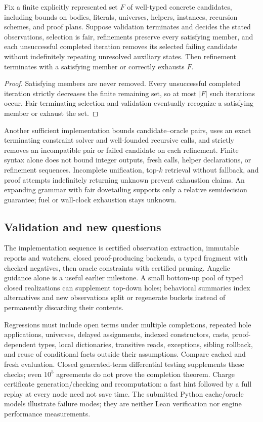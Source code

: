 \begin{theorem}\label{thm:evaluation-bounded}
Fix a finite explicitly represented set $F$ of well-typed concrete candidates,
including bounds on bodies, literals, universes, helpers, instances, recursion
schemes, and proof plans. Suppose validation terminates and decides the stated
observations, selection is fair, refinements preserve every satisfying member,
and each unsuccessful completed iteration removes its selected failing
candidate without indefinitely repeating unresolved auxiliary states.
Then refinement terminates with a satisfying member or correctly exhausts $F$.
\end{theorem}
\begin{proof}
Satisfying members are never removed. Every unsuccessful completed iteration
strictly decreases the finite remaining set, so at most $|F|$ such iterations
occur. Fair terminating selection and validation eventually recognize a
satisfying member or exhaust the set.
\end{proof}

Another sufficient implementation bounds candidate--oracle pairs, uses an
exact terminating constraint solver and well-founded recursive calls, and
strictly removes an incompatible pair or failed candidate on each refinement.
Finite syntax alone does not bound integer outputs, fresh calls, helper
declarations, or refinement sequences. Incomplete unification, top-$k$ retrieval
without fallback, and proof attempts indefinitely returning unknown prevent
exhaustion claims. An expanding grammar with fair dovetailing supports only a
relative semidecision guarantee; fuel or wall-clock exhaustion stays unknown.

\subsection{Validation and new questions}\label{sec:evaluation-checks}

The implementation sequence is certified observation extraction, immutable
reports and watchers, closed proof-producing backends, a typed fragment with
checked negatives, then oracle constraints with certified pruning. Angelic
guidance alone is a useful earlier milestone. A small bottom-up pool of typed
closed realizations can supplement top-down holes; behavioral summaries index
alternatives and new observations split or regenerate buckets instead of
permanently discarding their contents.

Regressions must include open terms under multiple completions, repeated hole
applications, universes, delayed assignments, indexed constructors, casts,
proof-dependent types, local dictionaries, transitive reads, exceptions,
sibling rollback, and reuse of conditional facts outside their assumptions.
Compare cached and fresh evaluation. Closed generated-term differential
testing supplements these checks; even $10^5$ agreements do not prove the
completion theorem. Charge certificate generation/checking and recomputation:
a fast hint followed by a full replay at every node need not save time.
The submitted Python cache/oracle models illustrate failure modes; they are
neither Lean verification nor engine performance measurements.

